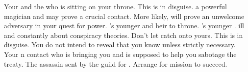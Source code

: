 \documentclass[char]{NeptuneBall}
\begin{document}
\begin{contacts}
  \contact{\cKing{}} Your \cKing{\nephew} and the \cKing{\mer} who is sitting on your throne.
  \contact{\cWitch{}} This is \cWitch{} in disguise. \cWitch{\They} \cWitch{\are} a powerful magician and may prove a crucial contact. More likely, \cWitch{\they} will prove an unwelcome adversary in your quest for power.
  \contact{\cPrincess{}} \cKing{}'s younger \cPrincess{\offspring} and heir to \cKing{\their} throne.
  \contact{\cPlant{}} \cKing{}'s younger \cPlant{\sibling}. \cPlant{\They} \cPlant{\are} ill and  constantly about conspiracy theories. Don't let \cPlant{\them} catch onto yours.
  \contact{\cQueen{}} This is \cQueen{} in disguise. You do not intend to reveal that you know \cQueen{\them} unless strictly necessary.
  \contact{\cSpy{}} Your \pPacifica{}n contact who is bringing you \iHemlock{} and is supposed to help you sabotage the treaty.
	\contact{\cDiplomat{}} The assassin sent by the guild for \cQueen{}. Arrange for \cDiplomat{\their} mission to succeed.
\end{contacts}
\end{document}
